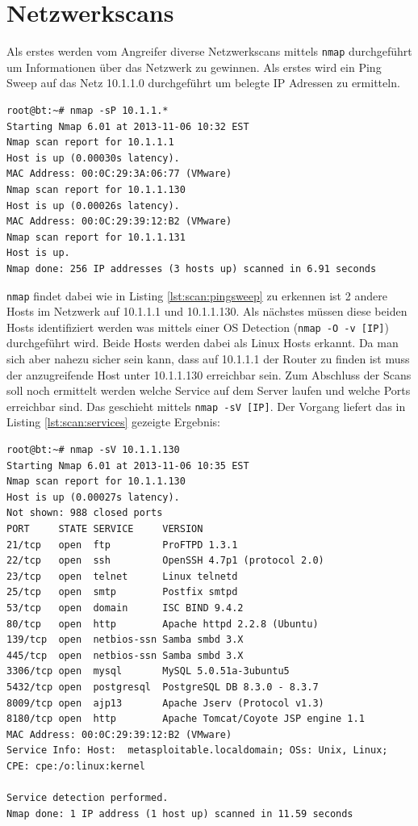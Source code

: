 \documentclass[a4paper,12pt]{article} %
\begin{document}
\section{Netzwerkscans}
\label{section:netzwerkscans}
Als erstes werden vom Angreifer diverse Netzwerkscans mittels \verb!nmap! durchgeführt um Informationen über das Netzwerk zu gewinnen. Als erstes wird ein Ping Sweep auf das Netz 10.1.1.0 durchgeführt um belegte IP Adressen zu ermitteln.

\begin{lstlisting}[style=code,caption={Ping Sweep auf 10.1.1.*},label=lst:scan:pingsweep]
root@bt:~# nmap -sP 10.1.1.*
Starting Nmap 6.01 at 2013-11-06 10:32 EST
Nmap scan report for 10.1.1.1
Host is up (0.00030s latency).
MAC Address: 00:0C:29:3A:06:77 (VMware)
Nmap scan report for 10.1.1.130
Host is up (0.00026s latency).
MAC Address: 00:0C:29:39:12:B2 (VMware)
Nmap scan report for 10.1.1.131
Host is up.
Nmap done: 256 IP addresses (3 hosts up) scanned in 6.91 seconds
\end{lstlisting}
\verb!nmap! findet dabei wie in Listing \ref{lst:scan:pingsweep} zu erkennen ist 2 andere Hosts im Netzwerk auf 10.1.1.1 und 10.1.1.130. Als nächstes müssen diese beiden Hosts identifiziert werden was mittels einer OS Detection (\verb!nmap -O -v [IP]!) durchgeführt wird. Beide Hosts werden dabei als Linux Hosts erkannt. Da man sich aber nahezu sicher sein kann, dass auf 10.1.1.1 der Router zu finden ist muss der anzugreifende Host unter 10.1.1.130 erreichbar sein. Zum Abschluss der Scans soll noch ermittelt werden welche Service auf dem Server laufen und welche Ports erreichbar sind. Das geschieht mittels \verb!nmap -sV [IP]!. Der Vorgang liefert das in Listing \ref{lst:scan:services} gezeigte Ergebnis:

\begin{lstlisting}[style=code,caption={Service Scan von 10.1.1.130},label=lst:scan:services]
root@bt:~# nmap -sV 10.1.1.130
Starting Nmap 6.01 at 2013-11-06 10:35 EST
Nmap scan report for 10.1.1.130
Host is up (0.00027s latency).
Not shown: 988 closed ports
PORT     STATE SERVICE     VERSION
21/tcp   open  ftp         ProFTPD 1.3.1
22/tcp   open  ssh         OpenSSH 4.7p1 (protocol 2.0)
23/tcp   open  telnet      Linux telnetd
25/tcp   open  smtp        Postfix smtpd
53/tcp   open  domain      ISC BIND 9.4.2
80/tcp   open  http        Apache httpd 2.2.8 (Ubuntu)
139/tcp  open  netbios-ssn Samba smbd 3.X 
445/tcp  open  netbios-ssn Samba smbd 3.X
3306/tcp open  mysql       MySQL 5.0.51a-3ubuntu5
5432/tcp open  postgresql  PostgreSQL DB 8.3.0 - 8.3.7
8009/tcp open  ajp13       Apache Jserv (Protocol v1.3)
8180/tcp open  http        Apache Tomcat/Coyote JSP engine 1.1
MAC Address: 00:0C:29:39:12:B2 (VMware)
Service Info: Host:  metasploitable.localdomain; OSs: Unix, Linux; CPE: cpe:/o:linux:kernel

Service detection performed.
Nmap done: 1 IP address (1 host up) scanned in 11.59 seconds
\end{lstlisting}
\end{document}
